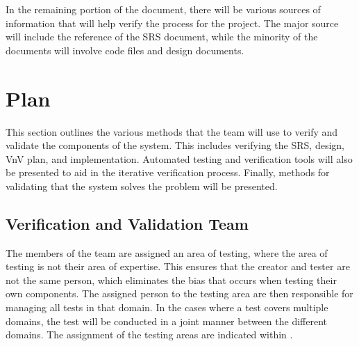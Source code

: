 \documentclass[12pt, titlepage]{article}
\begin{document}
In the remaining portion of the document, there will be various sources of information that will help verify the process for the project. The major source will include the reference of the SRS document, while the minority of the documents will involve code files and design documents.


\citet{SRS}

\section{Plan}

This section outlines the various methods that the team will use to verify and validate the components of the system. This includes verifying the SRS, design, VnV plan, and implementation. Automated testing and verification tools will also be presented to aid in the iterative verification process. Finally, methods for validating that the system solves the problem will be presented.

\subsection{Verification and Validation Team}

The members of the team are assigned an area of testing, where the area of testing is not their area of expertise. This ensures that the creator and tester are not the same person, which eliminates the bias that occurs when testing their own components. The assigned person to the testing area are then responsible for managing all tests in that domain. In the cases where a test covers multiple domains, the test will be conducted in a joint manner between the different domains. The assignment of the testing areas are indicated within .
  
\end{document}
